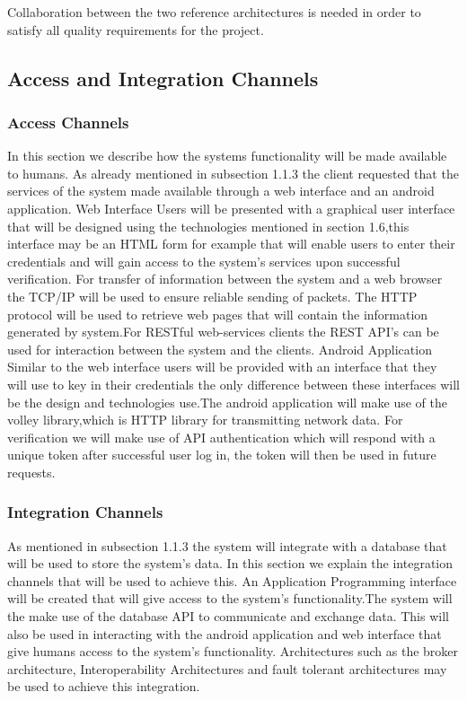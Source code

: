 \documentclass[a4paper,12pt]{article}
\begin{document}
Collaboration between the two reference architectures is needed in order to satisfy all quality requirements for the project.

\subsection{Access and Integration Channels}
\subsubsection{Access Channels}
In this section we describe how the systems functionality will be made available to humans. As already mentioned in subsection 1.1.3 the client requested that the services of the system made available through a web interface and an android application.
Web Interface
Users will be presented with a graphical user interface that will be designed using the technologies mentioned in 
section 1.6,this interface may be an HTML form for example that will enable users to enter their credentials and will gain access to the system's services upon successful verification.
For transfer of information between the system and a web browser the TCP/IP will be used to ensure reliable sending of packets. The HTTP protocol will be used to retrieve web pages that will contain the information generated by system.For RESTful web-services clients the REST API's can be used for interaction between the system and the clients.
Android Application
Similar to the web interface users will be provided with an interface that they will use to key in their credentials the only difference between these interfaces will be the design and technologies use.The android application will make use of the volley library,which is HTTP library for transmitting network data.
For verification we will make use of API authentication which will respond with a unique token after successful user log in, the token will then be used in future requests.
\subsubsection{Integration Channels}
As mentioned in subsection 1.1.3 the system will integrate with a database that will be used to store the system's data. In this section we explain the integration channels that will be used to achieve this.
An Application Programming interface will be created that will give access to the system's functionality.The system will the make use of the database API to communicate and exchange data. This will also be used in interacting with the android application and web interface that give humans access to the system's functionality. Architectures such as the broker architecture, Interoperability Architectures and fault tolerant architectures may be used to achieve this integration.
\end{document}
